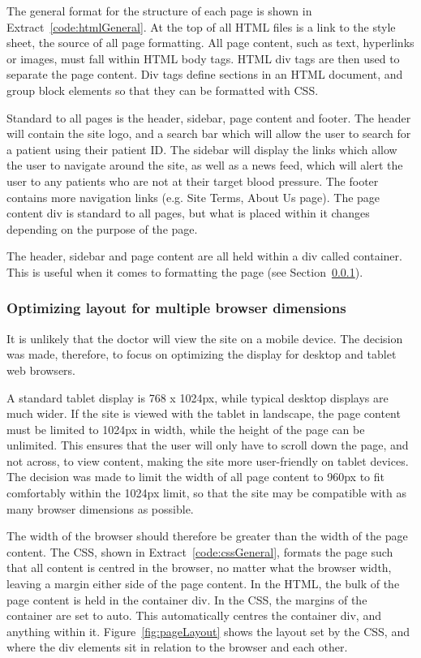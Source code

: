 \documentclass[11pt]{article}
\begin{document}
The general format for the structure of each page is shown in Extract~\ref{code:htmlGeneral}. At the top of all HTML files is a link to the style sheet, the source of all page formatting. All page content, such as text, hyperlinks or images, must fall within HTML body tags. HTML div tags are then used to separate the page content. Div tags define sections in an HTML document, and group block elements so that they can be formatted with CSS.

Standard to all pages is the header, sidebar, page content and footer. The header will contain the site logo, and a search bar which will allow the user to search for a patient using their patient ID. The sidebar will display the links which allow the user to navigate around the site, as well as a news feed, which will alert the user to any patients who are not at their target blood pressure. The footer contains more navigation links (e.g. Site Terms, About Us page). The page content div is standard to all pages, but what is placed within it changes depending on the purpose of the page.

The header, sidebar and page content are all held within a div called container. This is useful when it comes to formatting the page (see Section~\ref{sec:CSS}).

\subsubsection{Optimizing layout for multiple browser dimensions}
\label{sec:CSS}
It is unlikely that the doctor will view the site on a mobile device. The decision was made, therefore, to focus on optimizing the display for desktop and tablet web browsers.

A standard tablet display is 768 x 1024px, while typical desktop displays are much wider. If the site is viewed with the tablet in landscape, the page content must be limited to 1024px in width, while the height of the page can be unlimited. This ensures that the user will only have to scroll down the page, and not across, to view content, making the site more user-friendly on tablet devices. The decision was made to limit the width of all page content to 960px to fit comfortably within the 1024px limit, so that the site may be compatible with as many browser dimensions as possible.

The width of the browser should therefore be greater than the width of the page content. The CSS, shown in Extract~\ref{code:cssGeneral}, formats the page such that all content is centred in the browser, no matter what the browser width, leaving a margin either side of the page content. In the HTML, the bulk of the page content is held in the container div. In the CSS, the margins of the container are set to auto. This automatically centres the container div, and anything within it. Figure~\ref{fig:pageLayout} shows the layout set by the CSS, and where the div elements sit in relation to the browser and each other.
\end{document}

